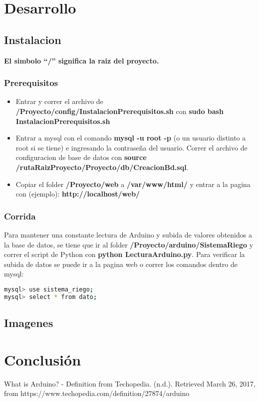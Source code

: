 \documentclass{article}
\begin{document}
\newpage
\section{Desarrollo}

\subsection{Instalacion}
\textbf{El simbolo ``/'' significa la raiz del proyecto.}

\subsubsection{Prerequisitos}

\begin{itemize}
	\item Entrar y correr el archivo de \textbf{/Proyecto/config/InstalacionPrerequisitos.sh} con \textbf{sudo bash InstalacionPrerequisitos.sh}
	\item Entrar a mysql con el comando \textbf{mysql -u root -p} (o un usuario distinto a root si se tiene) e ingresando la contrase\~na del usuario. Correr el archivo de configuracion de base de datos con \textbf{source /rutaRaizProyecto/Proyecto/db/CreacionBd.sql}.
	\item Copiar el folder \textbf{/Proyecto/web} a \textbf{/var/www/html/} y entrar a la pagina con (ejemplo): \textbf{http://localhost/web/}
\end{itemize}

\subsubsection{Corrida}
Para mantener una constante lectura de Arduino y subida de valores obtenidos a la base de datos, se tiene que ir al folder \textbf{/Proyecto/arduino/SistemaRiego} y correr el script de Python con \textbf{python LecturaArduino.py}.
\newline Para verificar la subida de datos se puede ir a la pagina web o correr los comandos dentro de mysql:
\begin{lstlisting}[language=bash]
mysql> use sistema_riego;
mysql> select * from dato;
\end{lstlisting}

\subsection{Imagenes}

\newpage
\section{Conclusión}

\renewcommand\refname{Referencias}
\begin{thebibliography}{1}
	 What is Arduino? - Definition from Techopedia. (n.d.). Retrieved March 26, 2017, from https://www.techopedia.com/definition/27874/arduino	
\end{thebibliography}
\end{document}
